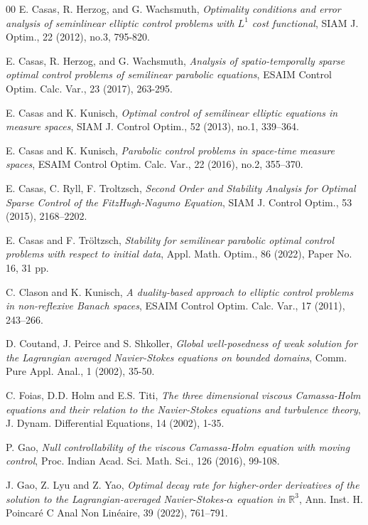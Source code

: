 \documentclass[reqno]{amsart}
\begin{document}
\begin{thebibliography}{00}
		 E. Casas, R. Herzog, and G. Wachsmuth, \textit{Optimality conditions and error analysis of seminlinear elliptic control problems with $L^1$ cost functional}, SIAM J. Optim., 22 (2012), no.3, 795-820.
		
		 E. Casas, R. Herzog, and G. Wachsmuth, \textit{Analysis of spatio-temporally sparse optimal control problems of semilinear parabolic equations}, ESAIM Control Optim. Calc. Var., 23 (2017), 263-295.
		
		 E. Casas and K. Kunisch, \textit{Optimal control of semilinear elliptic equations in measure spaces}, SIAM
		J. Control Optim., 52 (2013), no.1, 339–364.
		
		 E. Casas and K. Kunisch, \textit{Parabolic control problems in space-time measure spaces}, ESAIM Control Optim. Calc. Var., 22 (2016), no.2, 355–370.
		
		 E. Casas, C. Ryll, F. Troltzsch, \textit{Second Order and Stability Analysis for Optimal Sparse Control of the FitzHugh-Nagumo Equation}, SIAM J. Control Optim., 53 (2015), 2168–2202.
		
		 E. Casas and F. Tröltzsch, \textit{Stability for semilinear parabolic optimal control problems with respect to initial data}, Appl.  Math.  Optim., 86 (2022),  Paper No. 16, 31 pp.
		
		 C. Clason and K. Kunisch, \textit{A duality-based approach to elliptic control problems in non-reflexive
			Banach spaces}, ESAIM Control Optim. Calc. Var., 17 (2011), 243–266.
		
		 D. Coutand, J. Peirce and S. Shkoller, \textit{Global well-posedness of weak solution for the Lagrangian averaged Navier-Stokes equations on bounded domains}, Comm. Pure Appl. Anal., 1 (2002), 35-50. 
		
		 C. Foias, D.D. Holm and E.S. Titi, \textit{The three dimensional viscous Camassa-Holm equations and their relation to the Navier-Stokes equations and turbulence theory}, J. Dynam. Differential Equations, 14 (2002), 1-35.
		
		 P. Gao, \textit{Null controllability of the viscous Camassa-Holm equation with moving control}, Proc. Indian Acad. Sci. Math. Sci., 126 (2016), 99-108.
		
		 J. Gao, Z. Lyu and Z.  Yao, \textit{Optimal decay rate for higher-order derivatives of the solution to the Lagrangian-averaged Navier-Stokes-$\alpha$ equation in $\mathbb{R}^3$}, Ann. Inst. H. Poincaré C Anal Non Linéaire, 39 (2022),  761–791.
		

\end{thebibliography}
\end{document}
